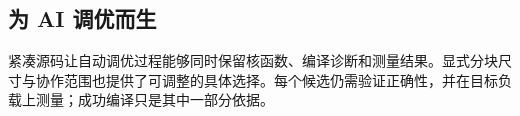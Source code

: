 \subsection*{为 AI 调优而生}

紧凑源码让自动调优过程能够同时保留核函数、编译诊断和测量结果。显式分块尺寸与协作范围也提供了可调整的具体选择。每个候选仍需验证正确性，并在目标负载上测量；成功编译只是其中一部分依据。
